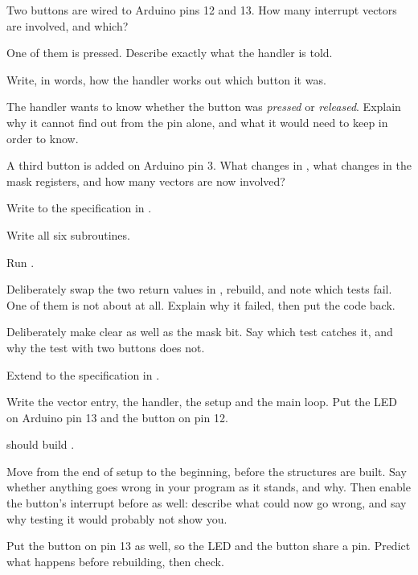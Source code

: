 \label{c3:ex:onevector}
\begin{parts}
  \item Two buttons are wired to Arduino pins 12 and 13. How many interrupt vectors are involved,
    and which?
  \item One of them is pressed. Describe exactly what the handler is told.
  \item Write, in words, how the handler works out which button it was.
  \item The handler wants to know whether the button was \emph{pressed} or \emph{released}. Explain
    why it cannot find out from the pin alone, and what it would need to keep in order to know.
  \item A third button is added on Arduino pin 3. What changes in , what changes in the
    mask registers, and how many vectors are now involved?
\end{parts}

\label{c3:ex:driver}
Write  to the specification in .
\begin{parts}
  \item Write all six subroutines.
  \item Run .
  \item Deliberately swap the two return values in , rebuild, and note
    which tests fail. One of them is not about  at all. Explain why it
    failed, then put the code back.
  \item Deliberately make  clear  as well as the mask bit.
    Say which test catches it, and why the test with two buttons does not.
\end{parts}

\label{c3:ex:handler}
Extend  to the specification in .
\begin{parts}
  \item Write the vector entry, the handler, the setup and the main loop. Put the LED on Arduino
    pin 13 and the button on pin 12.
  \item {} should build .
  \item Move  from the end of setup to the beginning, before the structures are built.
    Say whether anything goes wrong in your program as it stands, and why. Then enable the
    button's interrupt before  as well: describe what could now go wrong, and say
    why testing it would probably not show you.
  \item Put the button on pin 13 as well, so the LED and the button share a pin. Predict what
    happens before rebuilding, then check.
\end{parts}

